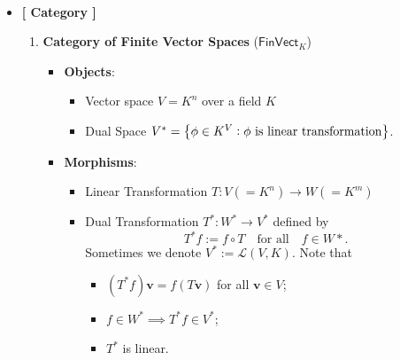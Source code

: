 \begin{example}
\begin{figure}[h!]
\end{figure}
\end{example}
\newpage
\begin{example}
\ \begin{itemize}
	\item[] \textbf{[ Category ]}
	\begin{enumerate}
		\item \textbf{Category of Finite Vector Spaces} ($\mathsf{FinVect}_K$)
		\begin{itemize}
			\item \textbf{Objects}: 
			\begin{itemize}
				\item Vector space $V=K^n$ over a field $K$
				\item Dual Space $V^*=\set{\phi\in K^{V}:\phi\ \text{is linear transformation}}$.
			\end{itemize}
			\item \textbf{Morphisms}:  
			\begin{itemize}
				\item Linear Transformation $T:V(=K^n)\to W(=K^m)$
				\item Dual Transformation $T^*:W^*\to V^*$ defined by \[
				T^*f:=f\circ T\quad\text{for all}\quad f\in W*.
				\] Sometimes we denote $V^*:=\mathcal{L}(V,K)$. Note that \begin{itemize}
					\item $(T^*f)\textbf{v}=f(T\textbf{v})$ for all $\textbf{v}\in V$;
					\item $f\in W^*\implies T^*f\in V^*$;
					\item $T^*$ is linear.
				\end{itemize}
			\end{itemize}
		\end{itemize}
	\end{enumerate}

\end{itemize}
\end{example}
